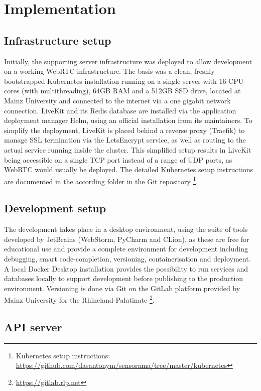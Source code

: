 \chapter{Implementation}

\section{Infrastructure setup}

Initially, the supporting server infrastructure was deployed to allow development on a working WebRTC infrastructure. The basis was a clean, freshly bootstrapped Kubernetes installation running on a single server with 16 CPU-cores (with multithreading), 64GB RAM and a 512GB SSD drive, located at Mainz University and connected to the internet via a one gigabit network connection. LiveKit and its Redis database are installed via the application deployment manager Helm, using an official installation from its maintainers. To simplify the deployment, LiveKit is placed behind a reverse proxy (Traefik) to manage SSL termination via the LetsEncrypt service, as well as routing to the actual service running inside the cluster. This simplified setup results in LiveKit being accessible on a single TCP port instead of a range of UDP ports, as WebRTC would usually be deployed. The detailed Kubernetes setup instructions are documented in the according folder in the Git repository \footnote{Kubernetes setup instructions: \href{https://github.com/dasantonym/sensorama/tree/master/kubernetes}{https://github.com/dasantonym/sensorama/tree/master/kubernetes}}.

\section{Development setup}

The development takes place in a desktop environment, using the suite of tools developed by JetBrains (WebStorm, PyCharm and CLion), as these are free for educational use and provide a complete environment for development including debugging, smart code-completion, versioning, containerisation and deployment. A local Docker Desktop installation provides the possibility to run services and databases locally to support development before publishing to the production environment. Versioning is done via Git on the GitLab platform provided by Mainz University for the Rhineland-Palatinate \footnote{\url{https://gitlab.rlp.net}}.


\section{API server}


